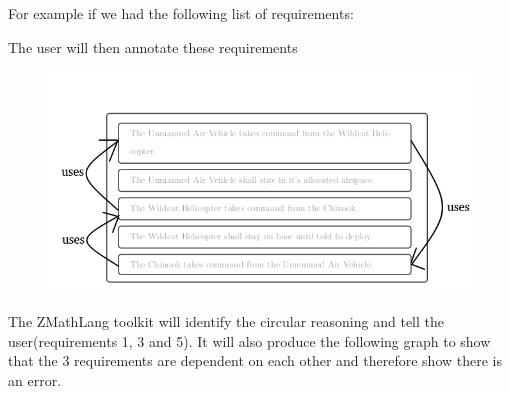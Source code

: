 For example if we had the following list of requirements:

\noindent{}


The user will then annotate these requirements

    

\begin{figure}[H]
    \includegraphics[width=12cm]{informal/zdra.png}
\end{figure}

The ZMathLang toolkit will identify the circular reasoning and tell the
user(requirements 1, 3 and 5). 
It will also produce the following graph to show that the 3 requirements are
dependent on each other and therefore show there is an error.

